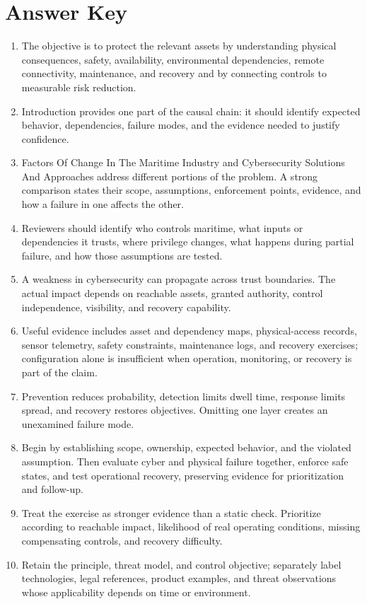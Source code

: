 \documentclass[11pt,letterpaper]{article}
\begin{document}
\section*{Answer Key}
\begin{enumerate}
\item The objective is to protect the relevant assets by understanding physical consequences, safety, availability, environmental dependencies, remote connectivity, maintenance, and recovery and by connecting controls to measurable risk reduction.
\item Introduction provides one part of the causal chain: it should identify expected behavior, dependencies, failure modes, and the evidence needed to justify confidence.
\item Factors Of Change In The Maritime Industry and Cybersecurity Solutions And Approaches address different portions of the problem. A strong comparison states their scope, assumptions, enforcement points, evidence, and how a failure in one affects the other.
\item Reviewers should identify who controls maritime, what inputs or dependencies it trusts, where privilege changes, what happens during partial failure, and how those assumptions are tested.
\item A weakness in cybersecurity can propagate across trust boundaries. The actual impact depends on reachable assets, granted authority, control independence, visibility, and recovery capability.
\item Useful evidence includes asset and dependency maps, physical-access records, sensor telemetry, safety constraints, maintenance logs, and recovery exercises; configuration alone is insufficient when operation, monitoring, or recovery is part of the claim.
\item Prevention reduces probability, detection limits dwell time, response limits spread, and recovery restores objectives. Omitting one layer creates an unexamined failure mode.
\item Begin by establishing scope, ownership, expected behavior, and the violated assumption. Then evaluate cyber and physical failure together, enforce safe states, and test operational recovery, preserving evidence for prioritization and follow-up.
\item Treat the exercise as stronger evidence than a static check. Prioritize according to reachable impact, likelihood of real operating conditions, missing compensating controls, and recovery difficulty.
\item Retain the principle, threat model, and control objective; separately label technologies, legal references, product examples, and threat observations whose applicability depends on time or environment.
\end{enumerate}
\end{document}
